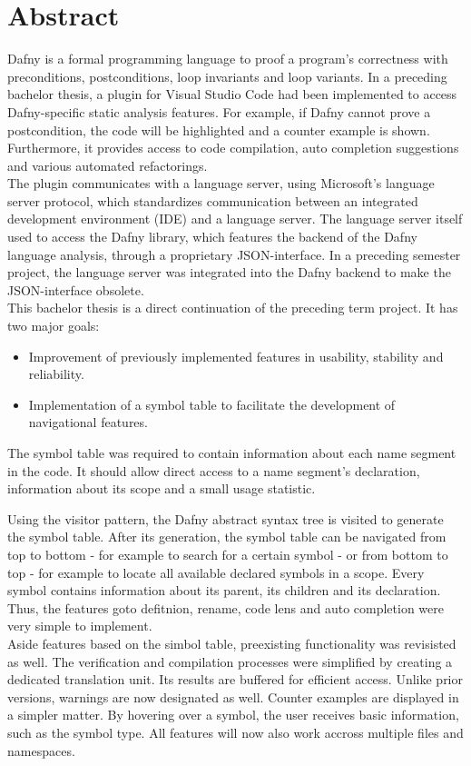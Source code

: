 \section{Abstract}
\label{section:abstract}

Dafny is a formal programming language to proof a program's correctness with preconditions, postconditions, loop invariants and loop variants.
In a preceding bachelor thesis, a plugin for Visual Studio Code had been implemented to access Dafny-specific static analysis features.
For example, if Dafny cannot prove a postcondition, the code will be highlighted and a counter example is shown.
Furthermore, it provides access to code compilation, auto completion suggestions and various automated refactorings.\\

The plugin communicates with a language server, using Microsoft's language server protocol, which standardizes communication between an integrated development environment (IDE) and a language server. 
The language server itself used to access the Dafny library, which features the backend of the Dafny language analysis, through a proprietary JSON-interface.
In a preceding semester project, the language server was integrated into the Dafny backend to make the JSON-interface obsolete.\\

This bachelor thesis is a direct continuation of the preceding term project.
It has two major goals:
\begin{itemize}
    \item Improvement of previously implemented features in usability, stability and reliability.
    \item Implementation of a symbol table to facilitate the development of navigational features.
\end{itemize}
The symbol table was required to contain information about each name segment in the code.
It should allow direct access to a name segment's declaration, information about its scope and a small usage statistic.

Using the visitor pattern, the Dafny abstract syntax tree is visited to generate the symbol table.
After its generation, the symbol table can be navigated from top to bottom - for example to search for a certain symbol - or from bottom to top - for example to locate all available declared symbols in a scope.
Every symbol contains information about its parent, its children and its declaration.
Thus, the features goto defitnion, rename, code lens and auto completion were very simple to implement.\\

Aside features based on the simbol table, preexisting functionality was revisisted as well.
The verification and compilation processes were simplified by creating a dedicated translation unit.
Its results are buffered for efficient access. Unlike prior versions, warnings are now designated as well.
Counter examples are displayed in a simpler matter.
By hovering over a symbol, the user receives basic information, such as the symbol type.
All features will now also work accross multiple files and namespaces.
